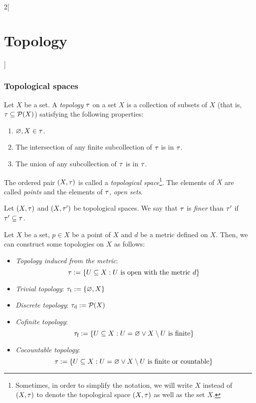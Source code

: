 \documentclass[../../../main.tex]{subfiles}
\begin{document}
\begin{multicols}{2}[\section{Topology}]
  \subsubsection{Topological spaces}
  \begin{definition}
    Let $X$ be a set. A \emph{topology} $\tau$ on a set $X$ is a collection of subsets of $X$ (that is, $\tau\subseteq\mathcal{P}(X)$) satisfying the following properties:
    \begin{enumerate}
      \item $\varnothing, X\in\tau$.
      \item The intersection of any finite subcollection of $\tau$ is in $\tau$.
      \item The union of any subcollection of $\tau$ is in $\tau$.
    \end{enumerate}
    The ordered pair $(X,\tau)$ is called a \emph{topological space}\footnote{Sometimes, in order to simplify the notation, we will write $X$ instead of $(X,\tau)$ to denote the topological space $(X,\tau)$ as well as the set $X$.}. The elements of $X$ are called \emph{points} and the elements of $\tau$, \emph{open sets}.
  \end{definition}
  \begin{definition}
    Let $(X,\tau)$ and $(X,\tau')$ be topological spaces. We say that $\tau$ is \emph{finer} than $\tau'$ if $\tau'\subseteq\tau$.
  \end{definition}
  \begin{proposition}
    Let $X$ be a set, $p\in X$ be a point of $X$ and $d$ be a metric defined on $X$. Then, we can construct some topologies on $X$ as follows:
    \begin{itemize}
      \item \emph{Topology induced from the metric}: $$\tau:=\{U\subseteq X:U\text{ is open with the metric }d\}$$
      \item \emph{Trivial topology}: $\tau_\text{t}:=\{\varnothing,X\}$
      \item \emph{Discrete topology}: $\tau_\text{d}:=\mathcal{P}(X)$
      \item \emph{Cofinite topology}: $$\tau_\text{f}:=\{U\subseteq X:U=\varnothing\lor X\setminus U\text{ is finite}\}$$
      \item \emph{Cocountable topology}:
            \begin{equation*}
              \tau:=\{U\subseteq X:U=\varnothing\lor X\setminus U\text{ is finite or countable}\}
            \end{equation*}

\end{itemize}
\end{proposition}
\end{multicols}
\end{document}
